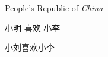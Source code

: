 \documentclass{ctexart}%
\newcommand{\PRC}{People's Republic of \emph{China}}
\newcommand{\loves}[2]{#1 喜欢 #2}%
\newcommand{\lo}[3][喜欢]{#2#1#3}
\begin{document}
	\PRC
	
	\loves{小明}{小李}%
	
	\lo{小刘}{小李}
\end{document}
